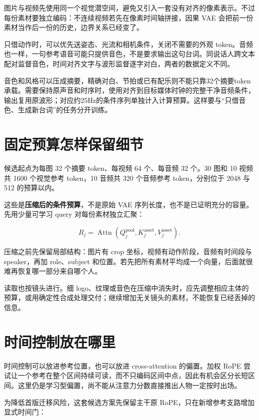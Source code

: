 图片与视频先使用同一个视觉潜空间，避免又引入一套没有对齐的像素表示。不过每份素材要独立编码：不连续视频若先在像素时间轴拼接，因果 VAE 会把前一份素材当作后一份的历史，边界关系已经变了。

只借动作时，可以优先送姿态、光流和相机条件，关闭不需要的外观 token。音频也一样，一句参考语音可能只提供音色，不是要求输出这句台词。同说话人跨文本配对监督音色，时间对齐文字与波形监督逐字对白，两者的数据定义不同。

音色和风格可以压成摘要，精确对白、节拍或已有配乐则不能只靠32个摘要token承载。需要保持原声音和时序时，使用对齐到目标媒体时钟的完整干净音频条件，输出复用原波形；对应约25Hz的条件序列单独计入计算预算。这样要与``只借音色、生成新台词''的任务分开训练。

\section{固定预算怎样保留细节}\label{seedance-m16-ux56faux5b9aux9884ux7b97ux600eux6837ux4fddux7559ux7ec6ux8282}

候选起点为每图 32 个摘要 token、每视频 64 个、每音频 32 个。30 图和 10 视频共 1600 个视觉参考 token，10 音频共 320 个音频参考 token，分别位于 2048 与 512 的预算以内。

这些是\textbf{压缩后的条件预算}，不是原始 VAE 序列长度，也不是已证明充分的容量。先用少量可学习 query 对每份素材独立汇聚：

\[
R_j=\operatorname{Attn}(Q_j^{\mathrm{pool}},K_j^{\mathrm{asset}},V_j^{\mathrm{asset}}).
\]

压缩之前先保留局部结构：图片有 crop 坐标，视频有动作阶段，音频有时间段与 speaker，再加 role、subject 和位置。若先把所有素材平均成一个向量，后面就很难再恢复哪一部分来自哪个人。

读取也按镜头进行。细 logo、纹理或音色在压缩中消失时，应先调整相应主体的预算，或用确定性合成处理交付；继续增加无关镜头的素材，不能恢复已经丢掉的信息。

\section{时间控制放在哪里}\label{seedance-m16-ux65f6ux95f4ux63a7ux5236ux653eux5728ux54eaux91cc}

时间控制可以放进参考位置，也可以放进 cross-attention 的偏置。加权 RoPE 尝试让一个参考在整个区间持续可读，而不只编码区间中点，因此有机会区分长短区间。这里仍是学习型偏置，尚不能从注意力分数直接推出人物一定按时出场。

为降低首版迁移风险，这套候选方案先保留主干原 RoPE，只在新增参考支路增加显式时间门：

